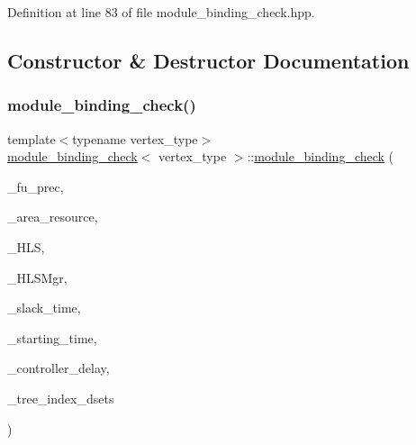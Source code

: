 Definition at line 83 of file module\+\_\+binding\+\_\+check.\+hpp.



\subsection{Constructor \& Destructor Documentation}
\mbox{\label{structmodule__binding__check_a2a39df26580579c42fc5a1e7d7a05311}} 
\subsubsection{\texorpdfstring{module\+\_\+binding\+\_\+check()}{module\_binding\_check()}\hspace{0.1cm}{\footnotesize\ttfamily [1/2]}}
{\footnotesize\ttfamily template$<$typename vertex\+\_\+type$>$ \\
\hyperlink{structmodule__binding__check}{module\+\_\+binding\+\_\+check}$<$ vertex\+\_\+type $>$\+::\hyperlink{structmodule__binding__check}{module\+\_\+binding\+\_\+check} (\begin{DoxyParamCaption}\item[{unsigned int}]{\+\_\+fu\+\_\+prec,  }\item[{double}]{\+\_\+area\+\_\+resource,  }\item[{const \hyperlink{hls_8hpp_a75d0c73923d0ddfa28c4843a802c73a7}{hls\+Ref}}]{\+\_\+\+H\+LS,  }\item[{const \hyperlink{hls__manager_8hpp_acd3842b8589fe52c08fc0b2fcc813bfe}{H\+L\+S\+\_\+manager\+Ref}}]{\+\_\+\+H\+L\+S\+Mgr,  }\item[{const \hyperlink{custom__map_8hpp_ad1ed68f2ff093683ab1a33522b144adc}{Custom\+Unordered\+Map}$<$ \hyperlink{graph_8hpp_abefdcf0544e601805af44eca032cca14}{vertex}, double $>$ \&}]{\+\_\+slack\+\_\+time,  }\item[{const \hyperlink{custom__map_8hpp_ad1ed68f2ff093683ab1a33522b144adc}{Custom\+Unordered\+Map}$<$ \hyperlink{graph_8hpp_abefdcf0544e601805af44eca032cca14}{vertex}, double $>$ \&}]{\+\_\+starting\+\_\+time,  }\item[{double}]{\+\_\+controller\+\_\+delay,  }\item[{\hyperlink{classmodule__register__binding__spec}{module\+\_\+register\+\_\+binding\+\_\+spec} \&}]{\+\_\+tree\+\_\+index\+\_\+dsets }\end{DoxyParamCaption})\hspace{0.3cm}{\ttfamily [inline]}}



